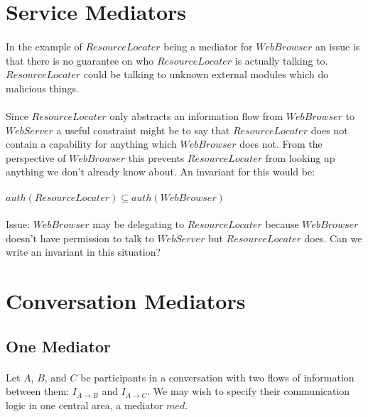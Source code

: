 \documentclass{article}
\begin{document}
\section{Service Mediators}

\paragraph{}
In the example of $ResourceLocater$ being a mediator for $WebBrowser$ an issue is that there is no guarantee on who $ResourceLocater$ is actually talking to. $ResourceLocater$ could be talking to unknown external modules which do malicious things.

\paragraph{}
Since $ResourceLocater$ only abstracts an information flow from $WebBrowser$ to $WebServer$ a useful constraint might be to say that $ResourceLocater$ does not contain a capability for anything which $WebBrowser$ does not. From the perspective of $WebBrowser$ this prevents $ResourceLocater$ from looking up anything we don't already know about. An invariant for this would be:

\paragraph{}
$auth(ResourceLocater) \subseteq auth(WebBrowser)$

\paragraph{}
Issue: $WebBrowser$ may be delegating to $ResourceLocater$ because $WebBrowser$ doesn't have permission to talk to $WebServer$ but $ResourceLocater$ does. Can we write an invariant in this situation?

\section{Conversation Mediators}

\subsection*{One Mediator}

\paragraph{}
Let $A$, $B$, and $C$ be participants in a conversation with two flows of information between them: $I_{A \rightarrow B}$ and $I_{A \rightarrow C}$. We may wish to specify their communication logic in one central area, a mediator $med$.
\end{document}
